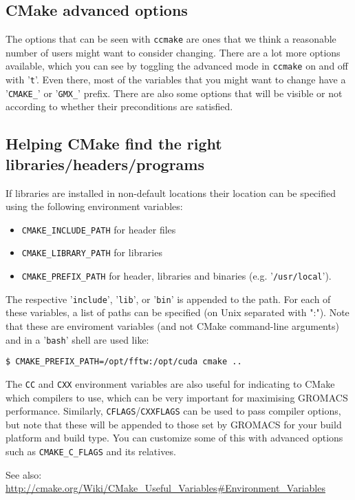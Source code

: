 \documentclass{article}[12pt,a4paper,twoside]
\newcommand{\gromacs}{GROMACS}
\newcommand{\cmake}{CMake}
\begin{document}
\begin{enumerate}
\subsection{CMake advanced options}
The options that can be seen with \verb+ccmake+ are ones that we
think a reasonable number of users might want to consider
changing. There are a lot more options available, which you can see by
toggling the advanced mode in \verb+ccmake+ on and off with
'\verb+t+'. Even there, most of the variables that you might want to
change have a '\verb+CMAKE_+' or '\verb+GMX_+' prefix. There are also
some options that will be visible or not according to whether
their preconditions are satisfied.

\subsection{Helping CMake find the right libraries/headers/programs}

If libraries are installed in non-default locations their location can
be specified using the following environment variables:
\begin{itemize}
\item \verb+CMAKE_INCLUDE_PATH+ for header files
\item \verb+CMAKE_LIBRARY_PATH+ for libraries
\item \verb+CMAKE_PREFIX_PATH+ for header, libraries and binaries
  (e.g. '\verb+/usr/local+').
\end{itemize}
The respective '\verb+include+', '\verb+lib+', or '\verb+bin+' is
appended to the path. For each of these variables, a list of paths can
be specified (on Unix separated with ":"). Note that these are
enviroment variables (and not \cmake{} command-line arguments) and in
a '\verb+bash+' shell are used like:
\begin{verbatim}
$ CMAKE_PREFIX_PATH=/opt/fftw:/opt/cuda cmake ..
\end{verbatim}

The \verb+CC+ and \verb+CXX+ environment variables are also useful
for indicating to \cmake{} which compilers to use, which can be very
important for maximising \gromacs{} performance. Similarly,
\verb+CFLAGS+/\verb+CXXFLAGS+ can be used to pass compiler
options, but note that these will be appended to those set by
\gromacs{} for your build platform and build type. You can customize
some of this with advanced options such as \verb+CMAKE_C_FLAGS+
and its relatives.

See also: \url{http://cmake.org/Wiki/CMake_Useful_Variables#Environment_Variables}


\end{enumerate}
\end{document}
